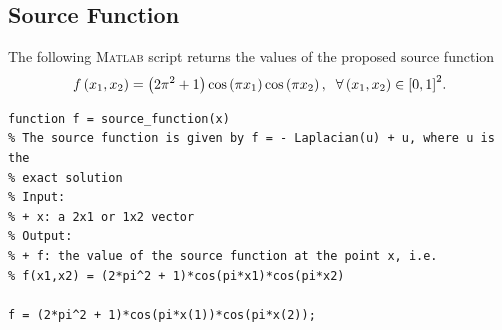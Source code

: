\documentclass[11pt,a4paper,center,notitlepage]{article}
\numberwithin{equation}{section}
\begin{document}
\subsection{Source Function}
The following \textsc{Matlab} script returns the values of the proposed source function
\begin{align}
f\left( {{x_1},{x_2}} \right) = \left( {2{\pi ^2} + 1} \right)\cos \left( {\pi {x_1}} \right)\cos \left( {\pi {x_2}} \right),\hspace{2mm}\forall \left( {{x_1},{x_2}} \right) \in {\left[ {0,1} \right]^2}.
 \end{align} 
\begin{verbatim}
function f = source_function(x)
% The source function is given by f = - Laplacian(u) + u, where u is the
% exact solution
% Input:
% + x: a 2x1 or 1x2 vector
% Output:
% + f: the value of the source function at the point x, i.e. 
% f(x1,x2) = (2*pi^2 + 1)*cos(pi*x1)*cos(pi*x2)

f = (2*pi^2 + 1)*cos(pi*x(1))*cos(pi*x(2)); 
\end{verbatim}
\end{document}

